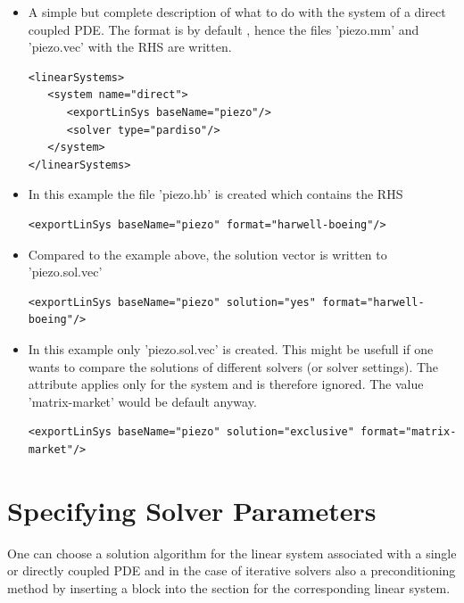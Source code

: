 \begin{itemize}
\item A simple but complete description of what to do with the system of a direct coupled PDE. The format is by default , hence the files 'piezo.mm' and 'piezo.vec' with the RHS are written. 
\begin{verbatim}
<linearSystems>
   <system name="direct">
      <exportLinSys baseName="piezo"/>
      <solver type="pardiso"/>
   </system>
</linearSystems>
\end{verbatim}
\item In this example the file 'piezo.hb' is created which contains the RHS
\begin{verbatim}
<exportLinSys baseName="piezo" format="harwell-boeing"/>
\end{verbatim}
\item Compared to the example above, the solution vector is written to 'piezo.sol.vec'
\begin{verbatim}
<exportLinSys baseName="piezo" solution="yes" format="harwell-boeing"/>
\end{verbatim}
\item In this example only 'piezo.sol.vec' is created. This might be usefull if one wants to compare
the solutions of different solvers (or solver settings). The  attribute applies only for the system and is therefore ignored. The value 'matrix-market' would be default anyway.
\begin{verbatim}
<exportLinSys baseName="piezo" solution="exclusive" format="matrix-market"/>
\end{verbatim}
\end{itemize}
%
\section{Specifying Solver Parameters}
\label{sec:Specifying_Solver_Parameters}
%
%
One can choose a solution algorithm for the linear system associated with a
single or directly coupled PDE and in the case of iterative solvers also a
preconditioning method by inserting a  block into the 
section for the corresponding linear system.

